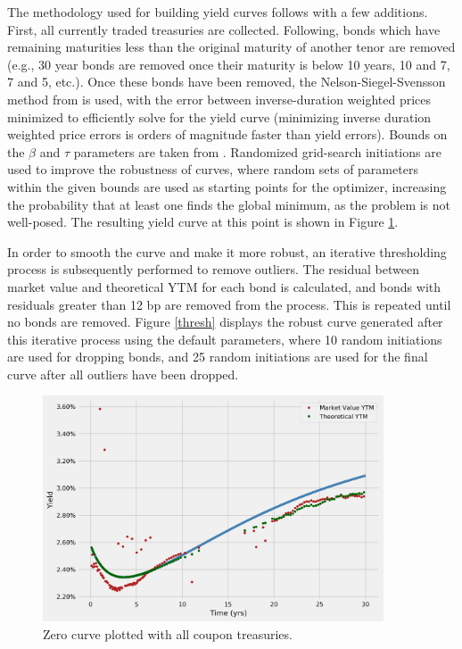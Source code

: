 \documentclass[12pt]{article}
\begin{document}
	
The methodology used for building yield curves follows \cite{termstrc} with a few additions. First, all currently traded treasuries are collected. Following, bonds which have remaining maturities less than the original maturity of another tenor are removed (e.g., 30 year bonds are removed once their maturity is below 10 years, 10 and 7, 7 and 5, etc.). Once these bonds have been removed, the Nelson-Siegel-Svensson method from \cite{termstrc} is used, with the error between inverse-duration weighted prices minimized to efficiently solve for the yield curve (minimizing inverse duration weighted price errors is orders of magnitude faster than yield errors). Bounds on the $\beta$ and $\tau$ parameters are taken from \cite{calibrating}. Randomized grid-search initiations are used to improve the robustness of curves, where random sets of parameters within the given bounds are used as starting points for the optimizer, increasing the probability that at least one finds the global minimum, as the problem is not well-posed. The resulting yield curve at this point is shown in Figure \ref{no_thresh}.\bigskip

In order to smooth the curve and make it more robust, an iterative thresholding process is subsequently performed to remove outliers. The residual between market value and theoretical YTM for each bond is calculated, and bonds with residuals greater than 12 bp are removed from the process. This is repeated until no bonds are removed. Figure \ref{thresh} displays the robust curve generated after this iterative process using the default parameters, where 10 random initiations are used for dropping bonds, and 25 random initiations are used for the final curve after all outliers have been dropped.

\begin{figure}[H]
	\centering
	\includegraphics[width=0.9\textwidth]{../../fig/treasury_curves/ytm_no_threshold}
	\caption{Zero curve plotted with all coupon treasuries.}
	\label{no_thresh}
\end{figure}
\end{document}
